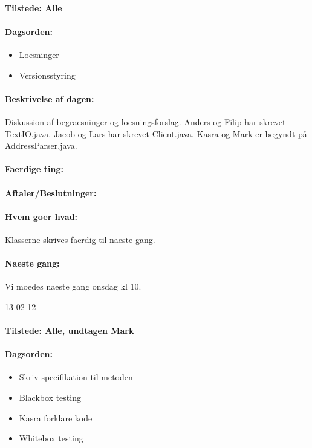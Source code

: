 \documentclass[a4paper,10pt,titlepage]{article}
\begin{document}
				\paragraph{Tilstede: Alle}
				\paragraph{Dagsorden:}
				\begin{itemize}
					\item Loesninger
					\item Versionsstyring
				\end{itemize}	
			\paragraph{Beskrivelse af dagen:}
			Diskussion af begraesninger og loesningsforslag. Anders og Filip har skrevet TextIO.java. Jacob og Lars har skrevet Client.java. Kasra og Mark er begyndt på AddressParser.java.
			\paragraph{Faerdige ting:}
			
			\paragraph{Aftaler/Beslutninger:}
			
			\paragraph{Hvem goer hvad:}
			Klasserne skrives faerdig til naeste gang.\
			
			\paragraph{Naeste gang:}
			Vi moedes naeste gang onsdag kl 10.\mbox{}\\
			
			\begin{center}
		13-02-12
		\end{center}
				\paragraph{Tilstede: Alle, undtagen Mark}
				\paragraph{Dagsorden:}
				\begin{itemize}
					\item Skriv specifikation til metoden
					\item Blackbox testing
					\item Kasra forklare kode
					\item Whitebox testing
				\end{itemize}
				
\end{document}
